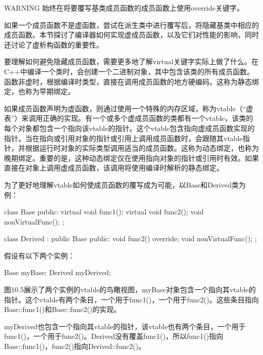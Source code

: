 \begin{myWarning}{WARNING}
始终在将要覆写基类成员函数的成员函数上使用override关键字。
\end{myWarning}


如果一个成员函数不是虚函数，尝试在派生类中进行覆写后，将隐藏基类中相应的成员函数。本节探讨了编译器如何实现虚成员函数，以及它们对性能的影响，同时还讨论了虚析构函数的重要性。


要理解如何避免隐藏成员函数，需要更多地了解virtual关键字实际上做了什么。在C++中编译一个类时，会创建一个二进制对象，其中包含该类的所有成员函数。函数非虚时，根据编译时类型，直接在调用成员函数的地方硬编码。这称为静态绑定，也称为早期绑定。

如果成员函数声明为虚函数，则通过使用一个特殊的内存区域，称为vtable（“虚表”）来调用正确的实现。有一个或多个虚成员函数的类都有一个vtable，该类的每个对象都包含一个指向该vtable的指针。这个vtable包含指向虚成员函数实现的指针。当在指向或引用对象的指针或引用上调用成员函数时，会跟随其vtable指针，并根据运行时对象的实际类型调用适当的成员函数。这称为动态绑定，也称为晚期绑定。重要的是，这种动态绑定仅在使用指向对象的指针或引用时有效。如果直接在对象上调用虚成员函数，该调用将使用编译时解析的静态绑定。

为了更好地理解vtable如何使成员函数的覆写成为可能，以Base和Derived类为例：

\begin{cpp}
class Base
{
    public:
        virtual void func1();
        virtual void func2();
        void nonVirtualFunc();
};

class Derived : public Base
{
    public:
        void func2() override;
        void nonVirtualFunc();
};
\end{cpp}

假设有以下两个实例：

\begin{cpp}
Base myBase;
Derived myDerived;
\end{cpp}

图10.5展示了两个实例的vtable的鸟瞰视图，myBase对象包含一个指向其vtable的指针。这个vtable有两个条目，一个用于func1()，一个用于func2()。这些条目指向Base::func1()和Base::func2()的实现。


myDerived也包含一个指向其vtable的指针，该vtable也有两个条目，一个用于func1()，一个用于func2()。Derived没有覆盖func1()，所以func1()指向Base::func1()，func2()指向Derived::func2()。

